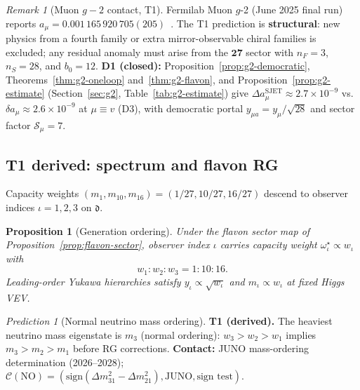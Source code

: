 \documentclass[11pt]{article}
\theoremstyle{plain}
\newtheorem{proposition}[theorem]{Proposition}
\theoremstyle{definition}
\theoremstyle{remark}
\newtheorem{remark}[theorem]{Remark}
\newtheorem{prediction}[theorem]{Prediction}
\numberwithin{equation}{section}
\begin{document}
\begin{remark}[Muon $g-2$ contact, T1]
Fermilab Muon $g$-2 (June 2025 final run) reports
$a_\mu=0.001\,165\,920\,705(205)$~\cite{MuonG2FNAL2025}.
The T1 prediction is \textbf{structural}: new physics from a fourth family or
extra mirror-observable chiral families is excluded; any residual anomaly must
arise from the $\mathbf{27}$ sector with $n_F=3$, $n_S=28$, and $b_0=12$.
\textbf{D1 (closed):} Proposition~\ref{prop:g2-democratic},
Theorems~\ref{thm:g2-oneloop} and~\ref{thm:g2-flavon}, and
Proposition~\ref{prop:g2-estimate} (Section~\ref{sec:g2},
Table~\ref{tab:g2-estimate}) give
$\Delta a_\mu^{\mathrm{SJET}}\approx2.7\times10^{-9}$ vs.\
$\delta a_\mu\approx2.6\times10^{-9}$ at $\mu\equiv v$ (D3), with democratic
portal $y_{\mu a}=y_\mu/\sqrt{28}$ and sector factor $\mathcal{S}_\mu=7$.
\end{remark}

\subsection{T1 derived: spectrum and flavon RG}
\label{sec:predictions:T1-derived-spectrum}

Capacity weights $(m_1,m_{10},m_{16})=(1/27,10/27,16/27)$ descend to observer
indices $\iota=1,2,3$ on $\mathfrak{d}$.

\begin{proposition}[Generation ordering]\label{prop:gen-ordering}
Under the flavon sector map of Proposition~\ref{prop:flavon-sector}, observer
index $\iota$ carries capacity weight $\omega^\star_\iota\propto w_\iota$ with
\begin{equation}\label{eq:capacity-weights}
  w_1:w_2:w_3 = 1:10:16.
\end{equation}
Leading-order Yukawa hierarchies satisfy $y_\iota\propto\sqrt{w_\iota}$ and
$m_\iota\propto w_\iota$ at fixed Higgs VEV.
\end{proposition}

\begin{prediction}[Normal neutrino mass ordering]\label{pred:nu-ordering}
\textbf{T1 (derived).} The heaviest neutrino mass eigenstate is $m_3$ (normal ordering):
$w_3>w_2>w_1$ implies $m_3>m_2>m_1$ before RG corrections.
\textbf{Contact:} JUNO mass-ordering determination (2026--2028);
$\mathcal{C}(\text{NO})=(\text{sign}(\Delta m^2_{31}-\Delta m^2_{21}),
\mathrm{JUNO},\text{sign test})$.
\end{prediction}
\end{document}
